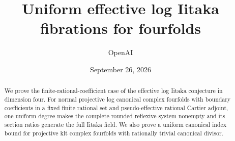 \documentclass[11pt]{article}
\title{Uniform effective log Iitaka fibrations for fourfolds}
\author{OpenAI}
\date{September 26, 2026}
\theoremstyle{definition}
\theoremstyle{remark}
\numberwithin{equation}{section}
\begin{document}
\maketitle
\begin{abstract}
We prove the finite-rational-coefficient case of the effective log Iitaka
conjecture in dimension four. For normal projective log canonical complex
fourfolds with boundary coefficients in a fixed finite rational set and
pseudo-effective rational Cartier adjoint, one uniform degree makes the
complete rounded reflexive system nonempty and its section ratios generate
the full Iitaka field. We also prove a uniform canonical index bound for
projective klt complex fourfolds with rationally trivial canonical divisor.
\end{abstract}


\tableofcontents











\end{document}
